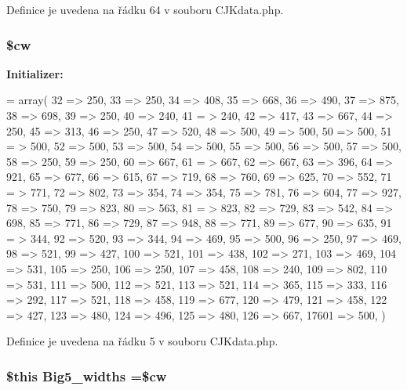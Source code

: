 Definice je uvedena na řádku 64 v souboru C\-J\-Kdata.\-php.

\hypertarget{_c_j_kdata_8php_ac2951b03dbb0317e6c61ec920b7479dc}{
\subsubsection[{\$cw}]{\setlength{\rightskip}{0pt plus 5cm}\$cw}}\label{_c_j_kdata_8php_ac2951b03dbb0317e6c61ec920b7479dc}
{\bfseries Initializer\-:}
\begin{DoxyCode}
= array(
    32 => 250, 33 => 250, 34 => 408, 35 => 668, 36 => 490, 37 => 875, 38 => 698, 39 => 250, 40 => 240, 41 =
      > 240,
    42 => 417, 43 => 667, 44 => 250, 45 => 313, 46 => 250, 47 => 520, 48 => 500, 49 => 500, 50 => 500, 51 =
      > 500,
    52 => 500, 53 => 500, 54 => 500, 55 => 500, 56 => 500, 57 => 500, 58 => 250, 59 => 250, 60 => 667, 61 =
      > 667,
    62 => 667, 63 => 396, 64 => 921, 65 => 677, 66 => 615, 67 => 719, 68 => 760, 69 => 625, 70 => 552, 71 =
      > 771,
    72 => 802, 73 => 354, 74 => 354, 75 => 781, 76 => 604, 77 => 927, 78 => 750, 79 => 823, 80 => 563, 81 =
      > 823,
    82 => 729, 83 => 542, 84 => 698, 85 => 771, 86 => 729, 87 => 948, 88 => 771, 89 => 677, 90 => 635, 91 =
      > 344,
    92 => 520, 93 => 344, 94 => 469, 95 => 500, 96 => 250, 97 => 469, 98 => 521, 99 => 427, 100 => 521, 101
       => 438,
    102 => 271, 103 => 469, 104 => 531, 105 => 250, 106 => 250, 107 => 458, 108 => 240, 109 => 802, 110 => 
      531, 111 => 500,
    112 => 521, 113 => 521, 114 => 365, 115 => 333, 116 => 292, 117 => 521, 118 => 458, 119 => 677, 120 => 
      479, 121 => 458,
    122 => 427, 123 => 480, 124 => 496, 125 => 480, 126 => 667,
    17601 => 500,
)
\end{DoxyCode}


Definice je uvedena na řádku 5 v souboru C\-J\-Kdata.\-php.

\hypertarget{_c_j_kdata_8php_a64801e8c1e125dfe17e10eeb51cf23f4}{
\subsubsection[{Big5\-\_\-widths}]{\setlength{\rightskip}{0pt plus 5cm}\$this Big5\-\_\-widths =\$cw}}\label{_c_j_kdata_8php_a64801e8c1e125dfe17e10eeb51cf23f4}


